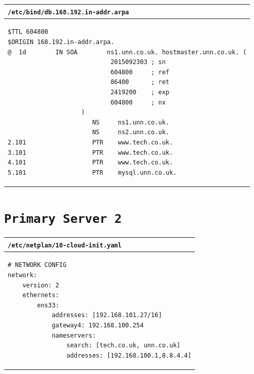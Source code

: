 \documentclass[11pt]{article}
\begin{document}
\begin{table}[ht]
    \begin{tabular}{|p{17.7cm}|} 
        \hline
        \texttt{\textbf{/etc/bind/db.168.192.in-addr.arpa}}\\ 
        \hline
        \lstset{
                basicstyle=\scriptsize\ttfamily,
              }
              \begin{lstlisting}
$TTL 604800
$ORIGIN 168.192.in-addr.arpa.
@  1d        IN SOA        ns1.unn.co.uk. hostmaster.unn.co.uk. (
                            2015092303 ; sn
                            604800     ; ref
                            86400      ; ret
                            2419200    ; exp
                            604800     ; nx
                    )
                       NS     ns1.unn.co.uk.
                       NS     ns2.unn.co.uk.
2.101                  PTR    www.tech.co.uk.
3.101                  PTR    www.tech.co.uk.
4.101                  PTR    www.tech.co.uk.
5.101                  PTR    mysql.unn.co.uk.
        \end{lstlisting}\\
        \hline
    \end{tabular}
\end{table}

\clearpage
\section{\texttt{Primary Server 2}}
\begin{table}[ht]
    \begin{tabular}{|p{17.7cm}|} 
        \hline
        \texttt{\textbf{/etc/netplan/10-cloud-init.yaml}}\\ 
        \hline
        \lstset{
                basicstyle=\scriptsize\ttfamily,
              }
              \begin{lstlisting}
# NETWORK CONFIG
network:
    version: 2
    ethernets:
        ens33:
            addresses: [192.168.101.27/16]
            gateway4: 192.168.100.254
            nameservers:
                search: [tech.co.uk, unn.co.uk]
                addresses: [192.168.100.1,8.8.4.4]
        \end{lstlisting}\\
        \hline
    \end{tabular}
\end{table}
\end{document}
